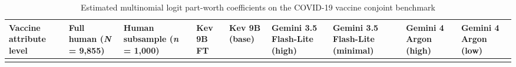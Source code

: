 \documentclass[
  letterpaper,
  DIV=11,
  numbers=noendperiod]{scrartcl}
\begin{document}
\nexttablesize{\scriptsize}
{\def\LTcaptype{apptbl}
\begin{longtable}[]{@{}
  >{\raggedright\arraybackslash}p{}
  >{\raggedleft\arraybackslash}p{}
  >{\raggedleft\arraybackslash}p{}
  >{\raggedleft\arraybackslash}p{}
  >{\raggedleft\arraybackslash}p{}
  >{\raggedleft\arraybackslash}p{}
  >{\raggedleft\arraybackslash}p{}
  >{\raggedleft\arraybackslash}p{}
  >{\raggedleft\arraybackslash}p{}@{}}
\caption{{\label{apptbl-wang-coefs}}Estimated multinomial logit
part-worth coefficients on the COVID-19 vaccine conjoint benchmark}\tabularnewline
\toprule\noalign{}
\begin{minipage}[b]{\linewidth}\raggedright
Vaccine attribute level
\end{minipage} & \begin{minipage}[b]{\linewidth}\raggedleft
Full human (\emph{N} = 9,855)
\end{minipage} & \begin{minipage}[b]{\linewidth}\raggedleft
Human subsample (\emph{n} = 1,000)
\end{minipage} & \begin{minipage}[b]{\linewidth}\raggedleft
Kev 9B FT
\end{minipage} & \begin{minipage}[b]{\linewidth}\raggedleft
Kev 9B (base)
\end{minipage} & \begin{minipage}[b]{\linewidth}\raggedleft
Gemini 3.5 Flash-Lite (high)
\end{minipage} & \begin{minipage}[b]{\linewidth}\raggedleft
Gemini 3.5 Flash-Lite (minimal)
\end{minipage} & \begin{minipage}[b]{\linewidth}\raggedleft
Gemini 4 Argon (high)
\end{minipage} & \begin{minipage}[b]{\linewidth}\raggedleft
Gemini 4 Argon (low)
\end{minipage} \\
\midrule\noalign{}
\endfirsthead
\toprule\noalign{}
\begin{minipage}[b]{\linewidth}\raggedright

\end{minipage}
\end{longtable}}
\end{document}
